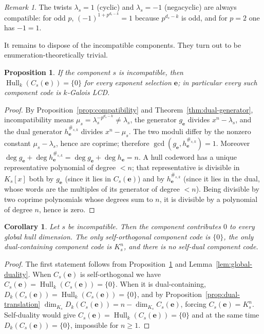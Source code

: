 \documentclass[preprint,12pt,a4paper]{elsarticle}
\newcommand{\Hull}{\operatorname{Hull}}
\newcommand{\Dk}{D_k}
\newtheorem{proposition}[theorem]{Proposition}
\newtheorem{corollary}[theorem]{Corollary}
\theoremstyle{definition}
\theoremstyle{remark}
\newtheorem{remark}[theorem]{Remark}
\begin{document}
\begin{remark}\label{rem:special-twists}
The twists $\lambda_s=1$ (cyclic) and $\lambda_s=-1$ (negacyclic) are always
compatible: for odd $p$, $(-1)^{1+p^{d_s-k}}=1$ because $p^{d_s-k}$ is odd, and
for $p=2$ one has $-1=1$.
\end{remark}

It remains to dispose of the incompatible components.  They turn out to be
enumeration-theoretically trivial.

\begin{proposition}\label{prop:incompatible}
If the component $s$ is incompatible, then
$\Hull_k(C_s(\mathbf{e}))=\{0\}$ for every exponent selection $\mathbf{e}$; in
particular every such component code is $k$-Galois LCD.
\end{proposition}

\begin{proof}
By Proposition~\ref{prop:compatibility} and Theorem~\ref{thm:dual-generator},
incompatibility means $\mu_s=\lambda_s^{-p^{d_s-k}}\neq\lambda_s$, the generator
$g_{\mathbf{e}}$ divides $x^n-\lambda_s$, and the dual generator
$h_{\mathbf{e}}^{\#_{s,k}}$ divides $x^n-\mu_s$.  The two moduli differ by the
nonzero constant $\mu_s-\lambda_s$, hence are coprime; therefore
$\gcd(g_{\mathbf{e}},h_{\mathbf{e}}^{\#_{s,k}})=1$.  Moreover
$\deg g_{\mathbf{e}}+\deg h_{\mathbf{e}}^{\#_{s,k}}
 =\deg g_{\mathbf{e}}+\deg h_{\mathbf{e}}=n$.
A hull codeword has a unique representative polynomial of degree $<n$; that
representative is divisible in $K_s[x]$ both by $g_{\mathbf{e}}$ (since it lies
in $C_s(\mathbf{e})$) and by $h_{\mathbf{e}}^{\#_{s,k}}$ (since it lies in the
dual, whose words are the multiples of its generator of degree $<n$).  Being
divisible by two coprime polynomials whose degrees sum to $n$, it is divisible
by a polynomial of degree $n$, hence is zero.
\end{proof}

\begin{corollary}\label{cor:incompatible}
Let $s$ be incompatible.  Then the component contributes $0$ to every global
hull dimension.  The only self-orthogonal component code is $\{0\}$, the only
dual-containing component code is $K_s^n$, and there is no self-dual component
code.
\end{corollary}

\begin{proof}
The first statement follows from Proposition~\ref{prop:incompatible} and
Lemma~\ref{lem:global-duality}.  When $C_s(\mathbf{e})$ is self-orthogonal we have
$C_s(\mathbf{e})=\Hull_k(C_s(\mathbf{e}))=\{0\}$.  When it is dual-containing,
$\Dk(C_s(\mathbf{e}))=\Hull_k(C_s(\mathbf{e}))=\{0\}$, and by
Proposition~\ref{prop:dual-translation}
$\dim_{K_s}\Dk(C_s(\mathbf{e}))=n-\dim_{K_s}C_s(\mathbf{e})$, forcing
$C_s(\mathbf{e})=K_s^n$.  Self-duality would give
$C_s(\mathbf{e})=\Hull_k(C_s(\mathbf{e}))=\{0\}$ and at the same time
$\Dk(C_s(\mathbf{e}))=\{0\}$, impossible for $n\geq1$.
\end{proof}
\end{document}
